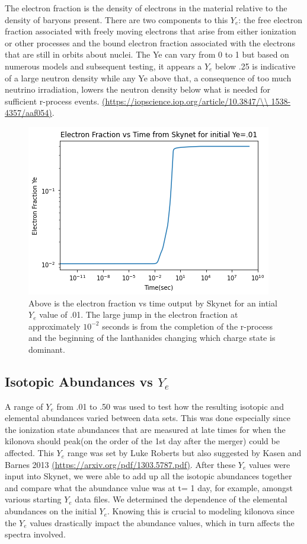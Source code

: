 \documentclass[11pt,a4paper]{article}
\begin{document}
The electron fraction is the density of electrons in the material relative to the density of baryons present. There are two components to this $Y_e$: the free electron fraction associated with freely moving electrons that arise from either ionization or other processes and the bound electron fraction associated with the electrons that are still in orbits about nuclei. The Ye can vary from 0 to 1 but based on numerous models and subsequent testing, it appears a $Y_e$ below .25 is indicative of a large neutron density while any Ye above that, a consequence of too much neutrino irradiation, lowers the neutron density below what is needed for sufficient r-process events. \url{(https://iopscience.iop.org/article/10.3847/\\ 1538-4357/aaf054)}.


\begin{figure}[h!]
  \includegraphics[scale = .75]{Ye_time.png}
  \centering
  \caption{Above is the electron fraction vs time output by Skynet for an intial $Y_e$ value of .01. The large jump in the electron fraction at approximately $10^{-2}$ seconds is from the completion of the r-process and the beginning of the lanthanides changing which charge state is dominant. }
\end{figure}


\subsection{Isotopic Abundances vs $Y_e$}

A range of $Y_e$ from .01 to .50 was used to test how the resulting isotopic and elemental abundances varied between data sets. This was done especially since the ionization state abundances that are measured at late times for when the kilonova should peak(on the order of the 1st day after the merger) could be affected. This $Y_e$ range was set by Luke Roberts but also suggested by Kasen and Barnes 2013 \url{(https://arxiv.org/pdf/1303.5787.pdf)}.
After these $Y_e$ values were input into Skynet, we were able to add up all the isotopic abundances together and compare what the abundance value was at t= 1 day, for example, amongst various starting $Y_e$ data files. We determined the dependence of the elemental abundances on the initial $Y_e$. Knowing this is crucial to modeling kilonova since the $Y_e$ values drastically impact the abundance values, which in turn affects the spectra involved.
\end{document}

